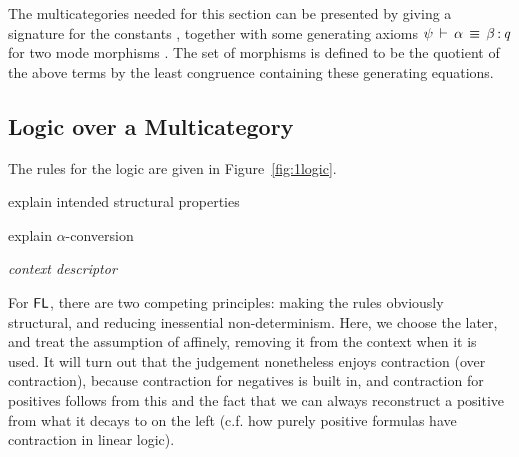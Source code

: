{The multicategories needed for this section can be presented by giving a
signature for the constants , together with some generating
axioms $\psi\,\vdash\,\mathit{\alpha} \, \equiv \, \mathit{\beta} \, \mathit{:} \, \mathit{q}$ for two mode morphisms
.  The set of morphisms is defined to be the
quotient of the above terms by the least congruence containing these
generating equations.

\subsection{Logic over a Multicategory}

The rules for the logic are given in Figure~\ref{fig:1logic}.  

explain intended structural properties

explain $\alpha$-conversion

\emph{context descriptor} 

For $\mathsf{FL}$, there are two competing principles: making the rules
obviously structural, and reducing inessential non-determinism.  Here,
we choose the later, and treat the assumption of \F{\alpha}{\Delta}
affinely, removing it from the context when it is used.  It will turn
out that the judgement nonetheless enjoys contraction (over
contraction), because contraction for negatives is built in, and
contraction for positives follows from this and the fact that we can
always reconstruct a positive from what it decays to on the left
(c.f. how purely positive formulas have contraction in linear logic).  

}
